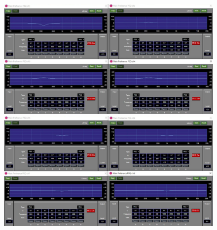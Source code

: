 \documentclass[11pt,a4j]{jreport}
\begin{document}
\newpage
{}
\begin{figure}[H]
  \begin{minipage}[b]{.5\linewidth}
    \centering
    \includegraphics[width=.9\linewidth]{images/experimentField/afcParameters/01alpha/05manualEQ6.jpg}
  \end{minipage}%
  \begin{minipage}[b]{.5\linewidth}
    \centering
    \includegraphics[width=.9\linewidth]{images/experimentField/afcParameters/01alpha/05manualEQ7.jpg}
  \end{minipage}


\end{figure}
\end{document}
